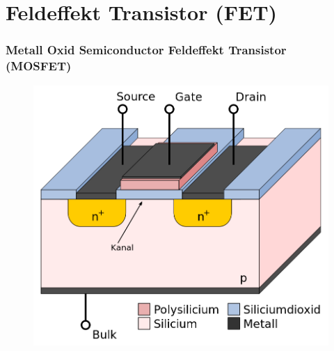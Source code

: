 \section*{Feldeffekt Transistor (FET)}
\begin{frame}
  \frametitle{Metall Oxid Semiconductor Feldeffekt Transistor (MOSFET)}
  \begin{center}
    \begin{figure}
      \includegraphics[width=\textwidth,height=.65\textheight,keepaspectratio]{e13/N-Kanal-MOSFET.png}
    \end{figure}
  \end{center}
\end{frame}

